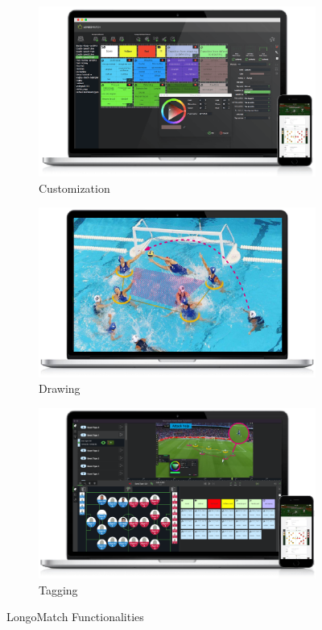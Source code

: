 \begin{figure}[htb]
    \centering 
\begin{subfigure}{0.33\textwidth}
\includegraphics[width=\linewidth]{img/customize_longo.png}
\caption{Customization}
\label{fig:customization_longo}
\end{subfigure}\hfil
\begin{subfigure}{0.33\textwidth}
\includegraphics[width=\linewidth]{img/drawing_longo.png}
\caption{Drawing}
\label{fig:drawing_longo}
\end{subfigure}\hfil 
\begin{subfigure}{0.33\textwidth}
\includegraphics[width=\linewidth]{img/tagging_longo.png}
\caption{Tagging}
\label{fig:tagging_longo}
\end{subfigure}\hfil 
\caption{
\label{fig:analysis_competitor}LongoMatch Functionalities}
\end{figure}

